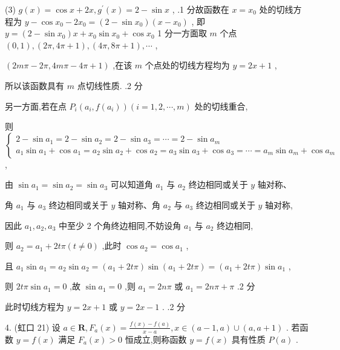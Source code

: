 \documentclass[10pt]{article}
\begin{document}
(3) \(g\left( x\right)  = \cos x + {2x},{g}^{\prime }\left( x\right)  = 2 - \sin x\) , .1 分故函数在 \(x = {x}_{0}\) 处的切线方程为 \(y - \cos {x}_{0} - 2{x}_{0} = \left( {2 - \sin {x}_{0}}\right) \left( {x - {x}_{0}}\right)\) , 即 \(y = \left( {2 - \sin {x}_{0}}\right) x + {x}_{0}\sin {x}_{0} + \cos {x}_{0}\) 1 分一方面取 \(m\) 个点 \(\left( {0,1}\right) ,\left( {{2\pi },{4\pi } + 1}\right) ,\left( {{4\pi },{8\pi } + 1}\right) ,\cdots\) ,

\(\left( {{2m\pi } - {2\pi },{4m\pi } - {4\pi } + 1}\right)\) ,在该 \(m\) 个点处的切线方程均为 \(y = {2x} + 1\) ,

所以该函数具有 \(m\) 点切线性质. .2 分

另一方面,若在点 \({P}_{i}\left( {{a}_{i},f\left( {a}_{i}\right) }\right) \left( {i = 1,2,\cdots ,m}\right)\) 处的切线重合,

则 \(\left\{  \begin{array}{l} 2 - \sin {a}_{1} = 2 - \sin {a}_{2} = 2 - \sin {a}_{3} = \cdots  = 2 - \sin {a}_{m} \\  {a}_{1}\sin {a}_{1} + \cos {a}_{1} = {a}_{2}\sin {a}_{2} + \cos {a}_{2} = {a}_{3}\sin {a}_{3} + \cos {a}_{3} = \cdots  = {a}_{m}\sin {a}_{m} + \cos {a}_{m} \end{array}\right.\) ,

由 \(\sin {a}_{1} = \sin {a}_{2} = \sin {a}_{3}\) 可以知道角 \({a}_{1}\) 与 \({a}_{2}\) 终边相同或关于 \(y\) 轴对称、

角 \({a}_{1}\) 与 \({a}_{3}\) 终边相同或关于 \(y\) 轴对称、角 \({a}_{2}\) 与 \({a}_{3}\) 终边相同或关于 \(y\) 轴对称,

因此 \({a}_{1},{a}_{2},{a}_{3}\) 中至少 2 个角终边相同,不妨设角 \({a}_{1}\) 与 \({a}_{2}\) 终边相同,

则 \({a}_{2} = {a}_{1} + {2t\pi }\left( {t \neq  0}\right)\) ,此时 \(\cos {a}_{2} = \cos {a}_{1}\) ,

且 \({a}_{1}\sin {a}_{1} = {a}_{2}\sin {a}_{2} = \left( {{a}_{1} + {2t\pi }}\right) \sin \left( {{a}_{1} + {2t\pi }}\right)  = \left( {{a}_{1} + {2t\pi }}\right) \sin {a}_{1}\) ,

则 \({2t\pi }\sin {a}_{1} = 0\) ,故 \(\sin {a}_{1} = 0\) ,则 \({a}_{1} = {2n\pi }\) 或 \({a}_{1} = {2n\pi } + \pi\) .2 分

此时切线方程为 \(y = {2x} + 1\) 或 \(y = {2x} - 1\) . .2 分

4. (虹口 21) 设 \(a \in  \mathbf{R},{F}_{a}\left( x\right)  = \frac{f\left( x\right)  - f\left( a\right) }{x - a},x \in  \left( {a - 1,a}\right)  \cup  \left( {a,a + 1}\right)\) . 若函数 \(y = f\left( x\right)\) 满足 \({F}_{a}\left( x\right)  > 0\) 恒成立,则称函数 \(y = f\left( x\right)\) 具有性质 \(P\left( a\right)\) .
\end{document}

